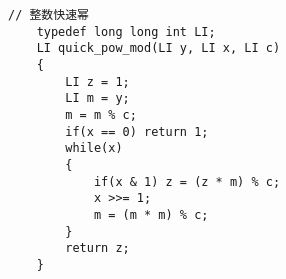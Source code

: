 \begin{Appendix}
\centering
\begin{tcolorbox}[colback=gray!10,
    colframe=black,
    width=12cm,
    arc=1mm, auto outer arc,
    boxrule=0.5pt,]
\begin{verbatim}
// 整数快速幂
    typedef long long int LI;
    LI quick_pow_mod(LI y, LI x, LI c)  
    {
        LI z = 1;
        LI m = y;
        m = m % c;
        if(x == 0) return 1;
        while(x)
        {   
            if(x & 1) z = (z * m) % c; 
            x >>= 1;
            m = (m * m) % c; 
        } 
        return z;
    } 

\end{verbatim}
\end{tcolorbox}
\end{Appendix}